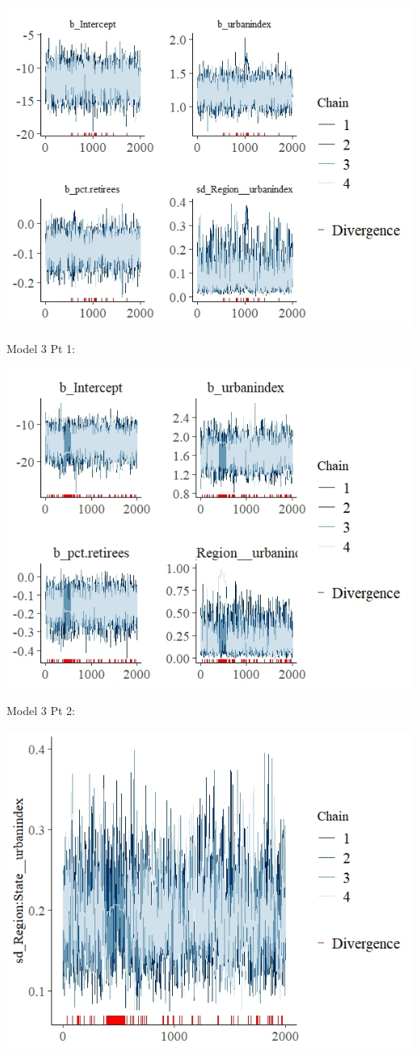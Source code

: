 \documentclass[12pt]{article}
\begin{document}
\includegraphics[scale = 1.4]{trace_plots/trace_model2.jpeg}

Model 3 Pt 1:

\includegraphics[scale = 1]{trace_plots/trace_model3_part1.jpeg}


Model 3 Pt 2: 

\includegraphics[scale = 1]{trace_plots/trace_model3_part2.jpeg}
\end{document}

